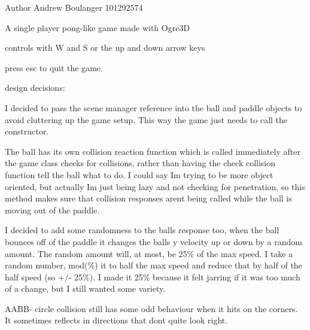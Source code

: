 \begin{DoxyAuthor}{Author}
Andrew Boulanger 101292574
\end{DoxyAuthor}
A single player pong-\/like game made with Ogre3D

controls with W and S or the up and down arrow keys

press esc to quit the game.

design decisions\+:

I decided to pass the scene manager reference into the ball and paddle objects to avoid cluttering up the game setup. This way the game just needs to call the constructor.

The ball has it\textquotesingle{}s own collision reaction function which is called immediately after the game class checks for collisions, rather than having the check collision function tell the ball what to do. I could say I\textquotesingle{}m trying to be more object oriented, but actually I\textquotesingle{}m just being lazy and not checking for penetration, so this method makes sure that collision responses aren\textquotesingle{}t being called while the ball is moving out of the paddle.

I decided to add some randomness to the ball\textquotesingle{}s response too, when the ball bounces off of the paddle it changes the ball\textquotesingle{}s y velocity up or down by a random amount. The random amount will, at most, be 25\% of the max speed. I take a random number, mod(\%) it to half the max speed and reduce that by half of the half speed (so +/-\/ 25\%). I made it 25\% because it felt jarring if it was too much of a change, but I still wanted some variety.

AABB-\/ circle collision still has some odd behaviour when it hits on the corners. It sometimes reflects in directions that don\textquotesingle{}t quite look right. 